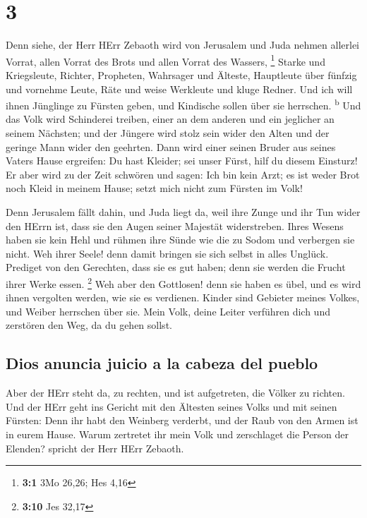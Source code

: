 \hypertarget{section-2}{%
\section{3}\label{section-2}}

 Denn siehe, der Herr HErr Zebaoth wird von Jerusalem und
Juda nehmen allerlei Vorrat, allen Vorrat des Brots und allen Vorrat des
Wassers, \footnote{\textbf{3:1} 3Mo 26,26; Hes 4,16} 
Starke und Kriegsleute, Richter, Propheten, Wahrsager und Älteste,
 Hauptleute über fünfzig und vornehme Leute, Räte und
weise Werkleute und kluge Redner.  Und ich will ihnen
Jünglinge zu Fürsten geben, und Kindische sollen über sie herrschen.
\textsuperscript{b}  Und das Volk wird Schinderei treiben,
einer an dem anderen und ein jeglicher an seinem Nächsten; und der
Jüngere wird stolz sein wider den Alten und der geringe Mann wider den
geehrten.  Dann wird einer seinen Bruder aus seines Vaters
Hause ergreifen: Du hast Kleider; sei unser Fürst, hilf du diesem
Einsturz!  Er aber wird zu der Zeit schwören und sagen:
Ich bin kein Arzt; es ist weder Brot noch Kleid in meinem Hause; setzt
mich nicht zum Fürsten im Volk!

 Denn Jerusalem fällt dahin, und Juda liegt da, weil ihre
Zunge und ihr Tun wider den HErrn ist, dass sie den Augen seiner
Majestät widerstreben.  Ihres Wesens haben sie kein Hehl
und rühmen ihre Sünde wie die zu Sodom und verbergen sie nicht. Weh
ihrer Seele! denn damit bringen sie sich selbst in alles Unglück.
 Prediget von den Gerechten, dass sie es gut haben; denn
sie werden die Frucht ihrer Werke essen. \footnote{\textbf{3:10} Jes
  32,17}  Weh aber den Gottlosen! denn sie haben es übel,
und es wird ihnen vergolten werden, wie sie es verdienen.
 Kinder sind Gebieter meines Volkes, und Weiber herrschen
über sie. Mein Volk, deine Leiter verführen dich und zerstören den Weg,
da du gehen sollst.

\hypertarget{dios-anuncia-juicio-a-la-cabeza-del-pueblo}{%
\subsection{Dios anuncia juicio a la cabeza del
pueblo}\label{dios-anuncia-juicio-a-la-cabeza-del-pueblo}}

 Aber der HErr steht da, zu rechten, und ist aufgetreten,
die Völker zu richten.  Und der HErr geht ins Gericht mit
den Ältesten seines Volks und mit seinen Fürsten: Denn ihr habt den
Weinberg verderbt, und der Raub von den Armen ist in eurem Hause.
 Warum zertretet ihr mein Volk und zerschlaget die Person
der Elenden? spricht der Herr HErr Zebaoth.

